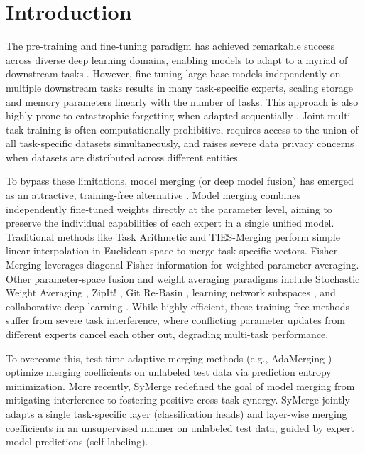 \documentclass{article}
\theoremstyle{plain}
\theoremstyle{definition}
\theoremstyle{remark}
\begin{document}
\section{Introduction}
\label{sec:intro}
The pre-training and fine-tuning paradigm has achieved remarkable success across diverse deep learning domains, enabling models to adapt to a myriad of downstream tasks \cite{Neyshabur2020}. However, fine-tuning large base models independently on multiple downstream tasks results in many task-specific experts, scaling storage and memory parameters linearly with the number of tasks. This approach is also highly prone to catastrophic forgetting when adapted sequentially \cite{Goodfellow2013, Kirkpatrick2017}. Joint multi-task training is often computationally prohibitive, requires access to the union of all task-specific datasets simultaneously, and raises severe data privacy concerns when datasets are distributed across different entities.

To bypass these limitations, model merging (or deep model fusion) has emerged as an attractive, training-free alternative \cite{Wortsman2022, Ilharco2022, Shen2024}. Model merging combines independently fine-tuned weights directly at the parameter level, aiming to preserve the individual capabilities of each expert in a single unified model. Traditional methods like Task Arithmetic \cite{Ilharco2022} and TIES-Merging \cite{Yadav2023} perform simple linear interpolation in Euclidean space to merge task-specific vectors. Fisher Merging \cite{Matena2022} leverages diagonal Fisher information for weighted parameter averaging. Other parameter-space fusion and weight averaging paradigms include Stochastic Weight Averaging \cite{Izmailov2018}, ZipIt! \cite{Stoica2023}, Git Re-Basin \cite{Ainsworth2023}, learning network subspaces \cite{Wortsman2021}, and collaborative deep learning \cite{Choset2022}. While highly efficient, these training-free methods suffer from severe task interference, where conflicting parameter updates from different experts cancel each other out, degrading multi-task performance.

To overcome this, test-time adaptive merging methods (e.g., AdaMerging \cite{Yang2024}) optimize merging coefficients on unlabeled test data via prediction entropy minimization. More recently, SyMerge \cite{Jung2025} redefined the goal of model merging from mitigating interference to fostering positive cross-task synergy. SyMerge jointly adapts a single task-specific layer (classification heads) and layer-wise merging coefficients in an unsupervised manner on unlabeled test data, guided by expert model predictions (self-labeling).
\end{document}
